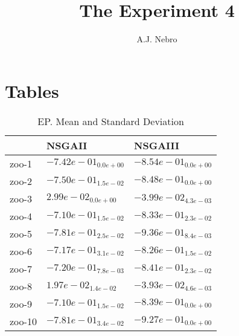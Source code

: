 \documentclass{article}
\title{The Experiment 4}
\author{A.J. Nebro}
\begin{document}
\maketitle
\section{Tables}

\begin{table}
\caption{EP. Mean and Standard Deviation}
\label{table: EP}
\centering
\begin{scriptsize}
\begin{tabular}{lll}
\hline & NSGAII &  NSGAIII\\
\hline 
zoo-1 & \cellcolor{gray25}$ -7.42e-01_{ 0.0e+00}$ & \cellcolor{gray95}$ -8.54e-01_{ 0.0e+00}$ \\
zoo-2 & \cellcolor{gray25}$ -7.50e-01_{ 1.5e-02}$ & \cellcolor{gray95}$ -8.48e-01_{ 0.0e+00}$ \\
zoo-3 & \cellcolor{gray25}$  2.99e-02_{ 0.0e+00}$ & \cellcolor{gray95}$ -3.99e-02_{ 4.3e-03}$ \\
zoo-4 & \cellcolor{gray25}$ -7.10e-01_{ 1.5e-02}$ & \cellcolor{gray95}$ -8.33e-01_{ 2.3e-02}$ \\
zoo-5 & \cellcolor{gray25}$ -7.81e-01_{ 2.5e-02}$ & \cellcolor{gray95}$ -9.36e-01_{ 8.4e-03}$ \\
zoo-6 & \cellcolor{gray25}$ -7.17e-01_{ 3.1e-02}$ & \cellcolor{gray95}$ -8.26e-01_{ 1.5e-02}$ \\
zoo-7 & \cellcolor{gray25}$ -7.20e-01_{ 7.8e-03}$ & \cellcolor{gray95}$ -8.41e-01_{ 2.3e-02}$ \\
zoo-8 & \cellcolor{gray25}$  1.97e-02_{ 1.4e-02}$ & \cellcolor{gray95}$ -3.93e-02_{ 4.6e-03}$ \\
zoo-9 & \cellcolor{gray25}$ -7.10e-01_{ 1.5e-02}$ & \cellcolor{gray95}$ -8.39e-01_{ 0.0e+00}$ \\
zoo-10 & \cellcolor{gray25}$ -7.81e-01_{ 3.4e-02}$ & \cellcolor{gray95}$ -9.27e-01_{ 0.0e+00}$ \\
\hline
\end{tabular}
\end{scriptsize}
\end{table}
\end{document}

